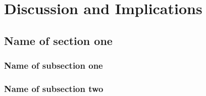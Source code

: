 \chapter{Discussion and Implications}

\lipsum[4]

\section{Name of section one}

\lipsum

\subsection{Name of subsection one}

\lipsum

\subsection{Name of subsection two}

\lipsum

